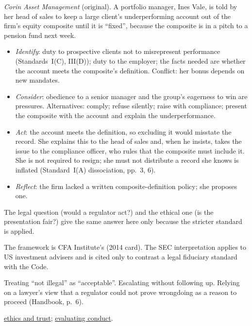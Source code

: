 \begin{qfmethod}
 \emph{Corin Asset Management} (original). A portfolio manager, Ines Vale, is told by her head of sales to keep a large client's underperforming account out of the firm's equity composite until it is ``fixed'', because the composite is in a pitch to a pension fund next week.
\begin{itemize}
\item \emph{Identify}: duty to prospective clients not to misrepresent performance (Standards~I(C), III(D)); duty to the employer; the facts needed are whether the account meets the composite's definition. Conflict: her bonus depends on new mandates.
\item \emph{Consider}: obedience to a senior manager and the group's eagerness to win are pressures. Alternatives: comply; refuse silently; raise with compliance; present the composite with the account and explain the underperformance.
\item \emph{Act}: the account meets the definition, so excluding it would misstate the record. She explains this to the head of sales and, when he insists, takes the issue to the compliance officer, who rules that the composite must include it. She is not required to resign; she must not distribute a record she knows is inflated (Standard~I(A) dissociation, pp.~3, 6).
\item \emph{Reflect}: the firm lacked a written composite-definition policy; she proposes one.
\end{itemize}
The legal question (would a regulator act?) and the ethical one (is the presentation fair?) give the same answer here only because the stricter standard is applied.

 The framework is CFA Institute's (2014 card). The SEC interpretation applies to US investment advisers and is cited only to contrast a legal fiduciary standard with the Code.

 Treating ``not illegal'' as ``acceptable''. Escalating without following up. Relying on a lawyer's view that a regulator could not prove wrongdoing as a reason to proceed (Handbook, p.~6).

 \hyperref[def:ethics-trust-professions]{ethics and trust}; \hyperref[meth:evaluating-conduct-cases]{evaluating conduct}.

\end{qfmethod}
